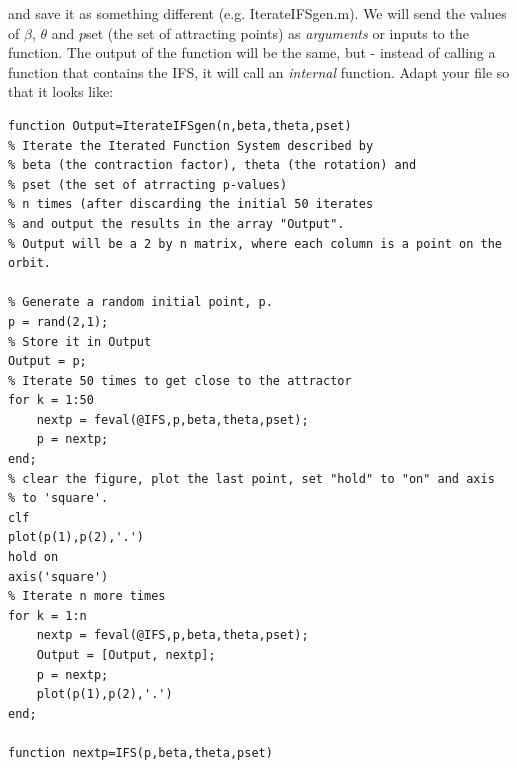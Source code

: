 \documentclass[12pt]{article}
\begin{document}
\begin{enumerate}
and save it as something different (e.g. IterateIFSgen.m).  We will send the values of $\beta$, $\theta$ and $p$set (the set of attracting points) as {\it arguments} or inputs to the function.  The output of the function will be the same, but - instead of calling a function that contains the IFS, it will call an {\it internal} function.  Adapt your file so that it looks like:
\begin{verbatim}  
function Output=IterateIFSgen(n,beta,theta,pset)
% Iterate the Iterated Function System described by
% beta (the contraction factor), theta (the rotation) and 
% pset (the set of atrracting p-values) 
% n times (after discarding the initial 50 iterates
% and output the results in the array "Output".  
% Output will be a 2 by n matrix, where each column is a point on the orbit.

% Generate a random initial point, p.
p = rand(2,1);
% Store it in Output
Output = p;
% Iterate 50 times to get close to the attractor
for k = 1:50
    nextp = feval(@IFS,p,beta,theta,pset);
    p = nextp;
end;
% clear the figure, plot the last point, set "hold" to "on" and axis
% to 'square'.  
clf
plot(p(1),p(2),'.')
hold on
axis('square')
% Iterate n more times
for k = 1:n
    nextp = feval(@IFS,p,beta,theta,pset);
    Output = [Output, nextp];
    p = nextp;
    plot(p(1),p(2),'.')
end;

function nextp=IFS(p,beta,theta,pset)


\end{verbatim}
\end{enumerate}
\end{document}
